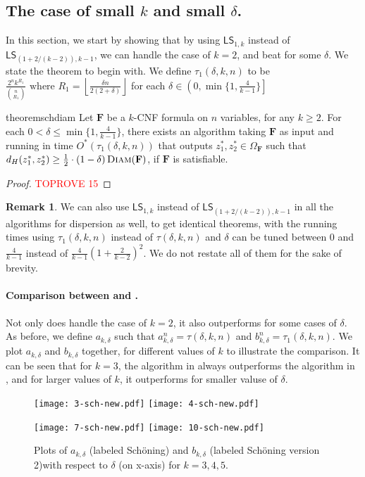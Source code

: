 \documentclass[11pt, letterpaper]{article}
\theoremstyle{definition}
\newtheorem{remark}{Remark}
\newcommand{\f}{\mathbf{F}}
\newcommand{\Om}{\Omega_{\f}}
\newcommand{\LS}{\textsf{LS}}
\newcommand{\D}{\textsc{Diam}}
\newcommand{\sch}{Sch\"{o}ning\xspace}
\newcommand{\floor}[1]{{\left\lfloor{#1}\right\rfloor}}
\begin{document}
\subsection{The case of small $k$ and small $\delta$.}
\label{app:more-sch}
In this section, we start by showing that by using $\LS_{1, k}$ instead of $\LS_{\left(1+2/(k-2)\right),k-1}$, we can handle the case of $k=2$, and beat  for some $\delta$. We state the theorem to begin with. We define $\tau_1(\delta,k, n)$ to be $\frac{2^n k^{R_1}}{\binom{n}{R_1}} \text{ where } R_1=\floor{\frac{\delta n}{2(2+\delta)}}$ for each $\delta \in \left( 0, \min\{1, \frac{4}{k-1} \}\right]$
\begin{restatable}[\sch for \D]{theorem}{schdiam}
    \label{thm:sch-for-dia-two}
    Let $\f$ be a $k$-CNF formula on $n$ variables, for any $k \geq 2$. For each $0 < \delta \leq \min\{1, \frac{4}{k-1} \}$, there exists an algorithm taking $\f$ as input and running in time $O^*\left( \tau_1(\delta, k, n)\right)$ that outputs $z_1^*, z_2^* \in \Om$ such that $d_H(z_1^*, z_2^*) \geq \frac{1}{2}\cdot \left(1-\delta \right) \D(\f)$, if $\f$ is satisfiable.
\end{restatable}
\begin{proof}\textcolor{red}{TOPROVE 15}\end{proof}
\begin{remark}
    We can also use $\LS_{1, k}$ instead of $\LS_{\left(1+2/(k-2)\right),k-1}$ in all the algorithms for dispersion as well, to get identical theorems, with the running times using $\tau_1(\delta,k, n)$ instead of $\tau(\delta, k, n)$ and $\delta$ can be tuned between $0$ and $\frac{4}{k-1}$ instead of $\frac{4}{k-1}\left(1+\frac{2}{k-2}\right)^2$. We do not restate all of them for the sake of brevity. 
\end{remark}
\paragraph{Comparison between  and .} Not only does  handle the case of $k=2$, it also outperforms  for some cases of $\delta$. As before, we define $a_{k, \delta}$ such that $a_{k,\delta}^n=\tau(\delta,k,n)$ and $b_{k,\delta}^n=\tau_1(\delta,k,n)$. We plot $a_{k,\delta}$ and $b_{k,\delta}$ together, for different values of $k$ to illustrate the comparison. It can be seen that for $k=3$, the algorithm in  always outperforms the algorithm in , and for larger values of $k$, it outperforms for smaller valuse of $\delta$. 
\begin{figure}[ht]
    \centering
    \texttt{[image: 3-sch-new.pdf]}
    \texttt{[image: 4-sch-new.pdf]}

    \texttt{[image: 7-sch-new.pdf]}
    \texttt{[image: 10-sch-new.pdf]}
    \caption{Plots of $a_{k,\delta}$ (labeled \sch) and $b_{k,\delta}$ (labeled \sch version 2)with respect to $\delta$ (on x-axis) for $k=3,4,5$.}
    \label{fig:enter-label}
\end{figure}
\end{document}
